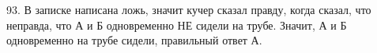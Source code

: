 93. В записке написана ложь, значит кучер сказал правду, когда сказал, что неправда, что А и Б одновременно НЕ сидели на трубе. Значит, А и Б одновременно на трубе сидели, правильный ответ А.\\
